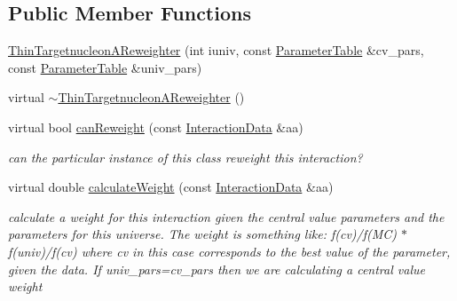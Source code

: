 \subsection*{Public Member Functions}
\begin{DoxyCompactItemize}
\item 
\hyperlink{class_neutrino_flux_reweight_1_1_thin_targetnucleon_a_reweighter_a0f394f48cb0b247cf8d0137b22066832}{Thin\-Targetnucleon\-A\-Reweighter} (int iuniv, const \hyperlink{class_neutrino_flux_reweight_1_1_parameter_table}{Parameter\-Table} \&cv\-\_\-pars, const \hyperlink{class_neutrino_flux_reweight_1_1_parameter_table}{Parameter\-Table} \&univ\-\_\-pars)
\item 
virtual \hyperlink{class_neutrino_flux_reweight_1_1_thin_targetnucleon_a_reweighter_ac7a6b08a70b9cee8d5005d5e818e5065}{$\sim$\-Thin\-Targetnucleon\-A\-Reweighter} ()
\item 
virtual bool \hyperlink{class_neutrino_flux_reweight_1_1_thin_targetnucleon_a_reweighter_ac412a741a29973bbefbb3daa0cf6636a}{can\-Reweight} (const \hyperlink{class_neutrino_flux_reweight_1_1_interaction_data}{Interaction\-Data} \&aa)
\begin{DoxyCompactList}\small\item\em can the particular instance of this class reweight this interaction? \end{DoxyCompactList}\item 
virtual double \hyperlink{class_neutrino_flux_reweight_1_1_thin_targetnucleon_a_reweighter_a98d78fabb1cb7fa39372846cb57b0845}{calculate\-Weight} (const \hyperlink{class_neutrino_flux_reweight_1_1_interaction_data}{Interaction\-Data} \&aa)
\begin{DoxyCompactList}\small\item\em calculate a weight for this interaction given the central value parameters and the parameters for this universe. The weight is something like\-: f(cv)/f(M\-C) $\ast$ f(univ)/f(cv) where cv in this case corresponds to the best value of the parameter, given the data. If univ\-\_\-pars=cv\-\_\-pars then we are calculating a central value weight \end{DoxyCompactList}\end{DoxyCompactItemize}

